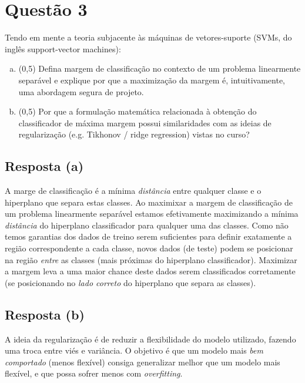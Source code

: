 \documentclass[final,3p]{elsarticle}
\numberwithin{equation}{section}
\begin{document}
\section{Questão 3}

    Tendo em mente a teoria subjacente às máquinas de vetores-suporte (SVMs, do inglês support-vector machines):

    \begin{enumerate}[(a)]
        \item (0,5) Defina margem de classificação no contexto de um problema linearmente separável e explique por que a maximização da margem é, intuitivamente, uma abordagem segura de projeto.
        \item (0,5) Por que a formulação matemática relacionada à obtenção do classificador de máxima margem possui similaridades com as ideias de regularização (e.g. Tikhonov / ridge regression) vistas no curso?
    \end{enumerate}

    \subsection{Resposta \textbf{(a)}}

        A marge de classificação é a mínima \emph{distância} entre qualquer classe e o hiperplano que separa estas classes. Ao maximixar a margem de classificação de um problema linearmente separável estamos efetivamente maximizando a mínima \emph{distância} do hiperplano classificador para qualquer uma das classes. Como não temos garantias dos dados de treino serem suficientes para definir exatamente a região correspondente a cada classe, novos dados (de teste) podem se posicionar na região \emph{entre} as classes (mais próximas do hiperplano classificador). Maximizar a margem leva a uma maior chance deste dados serem classificados corretamente (se posicionando no \emph{lado correto} do hiperplano que separa as classes).

    \subsection{Resposta \textbf{(b)}}

        A ideia da regularização é de reduzir a flexibilidade do modelo utilizado, fazendo uma troca entre viés e variância. O objetivo é que um modelo mais \emph{bem comportado} (menos flexível) consiga generalizar melhor que um modelo mais flexível, e que possa sofrer menos com \emph{overfitting}.
\end{document}
